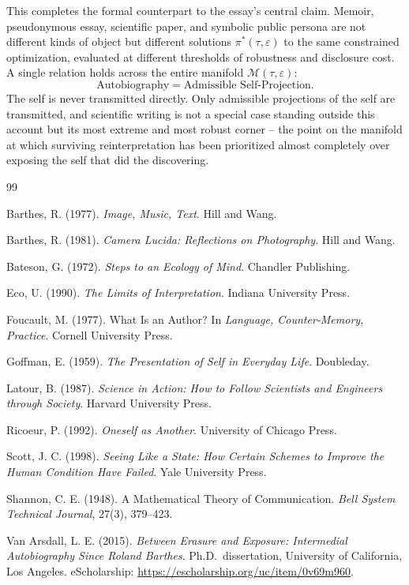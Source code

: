 \documentclass[11pt]{article}
\theoremstyle{plain}
\begin{document}
This completes the formal counterpart to the essay's central claim. Memoir, pseudonymous essay, scientific paper, and symbolic public persona are not different kinds of object but different solutions $\pi^\ast(\tau,\varepsilon)$ to the same constrained optimization, evaluated at different thresholds of robustness and disclosure cost. A single relation holds across the entire manifold $\mathcal{M}(\tau,\varepsilon)$:
\[
\text{Autobiography} \;=\; \text{Admissible Self-Projection.}
\]
The self is never transmitted directly. Only admissible projections of the self are transmitted, and scientific writing is not a special case standing outside this account but its most extreme and most robust corner -- the point on the manifold at which surviving reinterpretation has been prioritized almost completely over exposing the self that did the discovering.

\begin{thebibliography}{99}

 Barthes, R. (1977). \emph{Image, Music, Text}. Hill and Wang.

 Barthes, R. (1981). \emph{Camera Lucida: Reflections on Photography}. Hill and Wang.

 Bateson, G. (1972). \emph{Steps to an Ecology of Mind}. Chandler Publishing.

 Eco, U. (1990). \emph{The Limits of Interpretation}. Indiana University Press.

 Foucault, M. (1977). What Is an Author? In \emph{Language, Counter-Memory, Practice}. Cornell University Press.

 Goffman, E. (1959). \emph{The Presentation of Self in Everyday Life}. Doubleday.

 Latour, B. (1987). \emph{Science in Action: How to Follow Scientists and Engineers through Society}. Harvard University Press.

 Ricoeur, P. (1992). \emph{Oneself as Another}. University of Chicago Press.

 Scott, J. C. (1998). \emph{Seeing Like a State: How Certain Schemes to Improve the Human Condition Have Failed}. Yale University Press.

 Shannon, C. E. (1948). A Mathematical Theory of Communication. \emph{Bell System Technical Journal}, 27(3), 379--423.

 Van Arsdall, L. E. (2015). \emph{Between Erasure and Exposure: Intermedial Autobiography Since Roland Barthes}. Ph.D.\ dissertation, University of California, Los Angeles. eScholarship: \url{https://escholarship.org/uc/item/0v69m960}.

\end{thebibliography}
\end{document}
